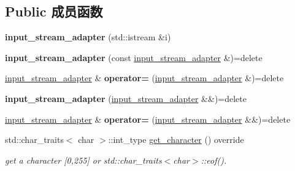 \subsection*{Public 成员函数}
\begin{DoxyCompactItemize}
\item 
\mbox{\label{classnlohmann_1_1detail_1_1input__stream__adapter_af487152e4606d013eb4ec6a90eaf82ea}} 
{\bfseries input\+\_\+stream\+\_\+adapter} (std\+::istream \&i)
\item 
\mbox{\label{classnlohmann_1_1detail_1_1input__stream__adapter_a5190fe4d0c5ff2e3b348b28ee3bb2218}} 
{\bfseries input\+\_\+stream\+\_\+adapter} (const \mbox{\hyperlink{classnlohmann_1_1detail_1_1input__stream__adapter}{input\+\_\+stream\+\_\+adapter}} \&)=delete
\item 
\mbox{\label{classnlohmann_1_1detail_1_1input__stream__adapter_aeac5048221929b8f7558d1698dd0fb3a}} 
\mbox{\hyperlink{classnlohmann_1_1detail_1_1input__stream__adapter}{input\+\_\+stream\+\_\+adapter}} \& {\bfseries operator=} (\mbox{\hyperlink{classnlohmann_1_1detail_1_1input__stream__adapter}{input\+\_\+stream\+\_\+adapter}} \&)=delete
\item 
\mbox{\label{classnlohmann_1_1detail_1_1input__stream__adapter_a0ae74b874f7db43640905cb7f2442b1d}} 
{\bfseries input\+\_\+stream\+\_\+adapter} (\mbox{\hyperlink{classnlohmann_1_1detail_1_1input__stream__adapter}{input\+\_\+stream\+\_\+adapter}} \&\&)=delete
\item 
\mbox{\label{classnlohmann_1_1detail_1_1input__stream__adapter_a3577dff99cc91968557b52959b0363e4}} 
\mbox{\hyperlink{classnlohmann_1_1detail_1_1input__stream__adapter}{input\+\_\+stream\+\_\+adapter}} \& {\bfseries operator=} (\mbox{\hyperlink{classnlohmann_1_1detail_1_1input__stream__adapter}{input\+\_\+stream\+\_\+adapter}} \&\&)=delete
\item 
\mbox{\label{classnlohmann_1_1detail_1_1input__stream__adapter_ae0760af923583de6354725e901d1869d}} 
std\+::char\+\_\+traits$<$ char $>$\+::int\+\_\+type \mbox{\hyperlink{classnlohmann_1_1detail_1_1input__stream__adapter_ae0760af923583de6354725e901d1869d}{get\+\_\+character}} () override
\begin{DoxyCompactList}\small\item\em get a character \mbox{[}0,255\mbox{]} or std\+::char\+\_\+traits$<$char$>$\+::eof(). \end{DoxyCompactList}\end{DoxyCompactItemize}


